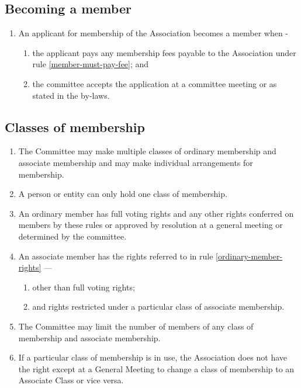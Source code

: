 \documentclass[../constitution.tex]{subfiles}
\begin{document}
\subsection{Becoming a member} \label{becoming-a-member}

\begin{enumerate}
\item An applicant for membership of the Association becomes a member when -
  \begin{enumerate}
  \item the applicant pays any membership fees payable to the Association under rule \ref{member-must-pay-fee}; and
  \item the committee accepts the application at a committee meeting or as stated in the by-laws.
  \end{enumerate}
\end{enumerate}


\subsection{Classes of membership} \label{classes-of-membership}

\begin{enumerate}
\item The Committee may make multiple classes of ordinary membership and associate membership and may make individual arrangements for membership.
\item A person or entity can only hold one class of membership.
\item An ordinary member has full voting rights and any other rights conferred on members by these rules or approved by resolution at a general meeting or determined by the committee. \label{ordinary-member-rights}
\item An associate member has the rights referred to in rule \ref{ordinary-member-rights} --- \label{associate-member-rights}
  \begin{enumerate}
  \item other than full voting rights;
  \item and rights restricted under a particular class of associate membership.
  \end{enumerate}
\item The Committee may limit the number of members of any class of membership and associate membership.
\item If a particular class of membership is in use, the Association does not have the right except at a General Meeting to change a class of membership to an Associate Class or vice versa.
\end{enumerate}
\end{document}
